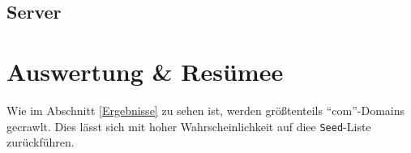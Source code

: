 \documentclass[a4paper,12pt,titlepage=false]{scrreprt}
\begin{document}
\section{Server}
\vspace{.1cm}


\chapter{Auswertung \& Resümee}

Wie im Abschnitt \ref{Ergebnisse} zu sehen ist, werden größtenteils ``com''-Domains gecrawlt. Dies lässt sich mit hoher Wahrscheinlichkeit auf diee \texttt{Seed}-Liste zurückführen.
\end{document}
